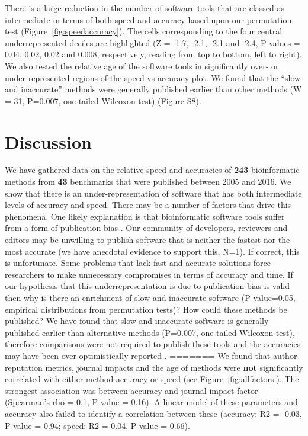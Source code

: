 \documentclass[fleqn,10pt]{SelfArx} %
\begin{document}
There is a large reduction in the number of software tools that are classed as intermediate in terms of both speed and accuracy based upon our permutation test (Figure~\ref{fig:speedaccuracy}). The cells corresponding to the four central underrepresented deciles are highlighted (Z = -1.7, -2.1, -2.1 and -2.4, P-values = 0.04, 0.02, 0.02 and 0.008, respectively, reading from top to bottom, left to right). We also tested the relative age of the software tools in significantly over- or under-represented regions of the speed vs accuracy plot. We found that the “slow and inaccurate” methods were generally published earlier than other methods (W = 31, P=0.007, one-tailed Wilcoxon test) (Figure S8).

\section*{Discussion}

We have gathered data on the relative speed and accuracies of \textbf{{\color{black}243}} bioinformatic methods from \textbf{{\color{black}43}} benchmarks that were published between 2005 and 2016. We show that there is an under-representation of software that has both intermediate levels of accuracy and speed. There may be a number of factors that drive this phenomena. One likely explanation is that bioinformatic software tools suffer from a form of publication bias \cite{Boulesteix2015-am}. Our community of developers, reviewers and editors may be unwilling to publish software that is neither the fastest nor the most accurate (we have anecdotal evidence to support this, N=1). If correct, this is unfortunate. Some problems that lack fast and accurate solutions force researchers to make unnecessary compromises in terms of accuracy and time. If our hypothesis that this underrepresentation is due to publication bias is valid then why is there an enrichment of slow and inaccurate software (P-value=0.05, empirical distributions from permutation tests)? How could these methods be published? We have found that slow and inaccurate software is generally published earlier than alternative methods (P=0.007, one-tailed Wilcoxon test), therefore comparisons were not required to publish these tools and the accuracies may have been over-optimistically reported \cite{Boulesteix2015-nc}.
=======
We found that author reputation metrics, journal impacts and the age of methods were \textbf{not} significantly correlated with either method accuracy or speed (see Figure~\ref{fig:allfactors}). The strongest association was between accuracy and journal impact factor (Spearman’s rho = 0.1, P-value = 0.16). A linear model of these parameters and accuracy also failed to identify a correlation between these (accuracy: R2 = -0.03, P-value = 0.94; speed: R2 = 0.04, P-value = 0.66). 
\end{document}
